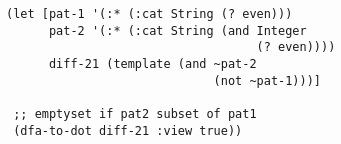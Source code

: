 \begin{lstlisting}[style=reclojureClojure]
(let [pat-1 '(:* (:cat String (? even)))
      pat-2 '(:* (:cat String (and Integer
                                   (? even))))
      diff-21 (template (and ~pat-2 
                             (not ~pat-1)))]

 ;; emptyset if pat2 subset of pat1
 (dfa-to-dot diff-21 :view true))
\end{lstlisting}
